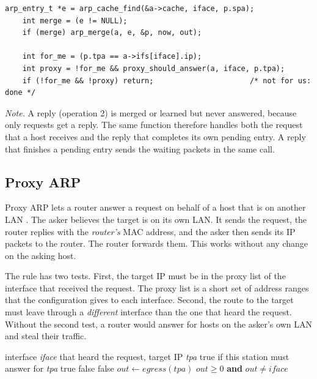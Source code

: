 \begin{lstlisting}[style=corelst, firstnumber=92, caption={\code{src/arp.c}, lines 92--98: merge before the target test.}]
    arp_entry_t *e = arp_cache_find(&a->cache, iface, p.spa);
    int merge = (e != NULL);
    if (merge) arp_merge(a, e, &p, now, out);

    int for_me = (p.tpa == a->ifs[iface].ip);
    int proxy = !for_me && proxy_should_answer(a, iface, p.tpa);
    if (!for_me && !proxy) return;                      /* not for us: done */
\end{lstlisting}

\emph{Note.} A reply (operation 2) is merged or learned but never answered, because only requests get a reply. The same function therefore handles both the request that a host receives and the reply that completes its own pending entry. A reply that finishes a pending entry sends the waiting packets in the same call.

\subsection{Proxy ARP}\label{sec:core-proxy}
Proxy ARP lets a router answer a request on behalf of a host that is on another LAN \cite{forouzan, topic14}. The asker believes the target is on its own LAN. It sends the request, the router replies with the \emph{router's} MAC address, and the asker then sends its IP packets to the router. The router forwards them. This works without any change on the asking host.

The rule has two tests. First, the target IP must be in the proxy list of the interface that received the request. The proxy list is a short set of address ranges that the configuration gives to each interface. Second, the route to the target must leave through a \emph{different} interface than the one that heard the request. Without the second test, a router would answer for hosts on the asker's own LAN and steal their traffic.

\begin{algorithm}[H]\small
\caption{Proxy decision (, )}
\label{alg:proxy}
\begin{algorithmic}[1]
\Require interface \textit{iface} that heard the request, target IP \textit{tpa}
\Ensure true if this station must answer for \textit{tpa}
     \Return true
    \EndIf
  \EndFor
  \State \Return false
\EndFunction
{}
   \Return false
  \EndIf
  \State $out \gets egress(tpa)$ 
  \State \Return $out \ge 0$ \textbf{and} $out \ne iface$
\EndFunction
\end{algorithmic}
\end{algorithm}

